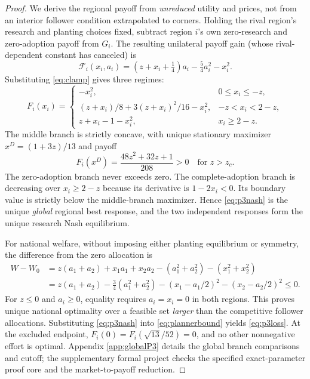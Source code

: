 \documentclass[11pt,a4paper]{article}
\begin{document}
\begin{proof}
We derive the regional payoff from \emph{unreduced} utility and prices, not from an interior follower condition extrapolated to corners. Holding the rival region's research and planting choices fixed, subtract region $i$'s own zero-research and zero-adoption payoff from $G_i$. The resulting unilateral payoff gain (whose rival-dependent constant has canceled) is
\begin{equation}
 \mathcal F_i(x_i,a_i)
 =(z+x_i+\tfrac14)a_i-\tfrac54a_i^2-x_i^2.
 \label{eq:offpathpayoff}
\end{equation}
Substituting \eqref{eq:clamp} gives three regimes:
\begin{equation}
 F_i(x_i)=
 \begin{cases}
 -x_i^2,&0\leq x_i\leq-z,\\[2pt]
 (z+x_i)/8+3(z+x_i)^2/16-x_i^2,&-z<x_i<2-z,\\[2pt]
 z+x_i-1-x_i^2,&x_i\geq2-z.
 \end{cases}
 \label{eq:threebranches}
\end{equation}
The middle branch is strictly concave, with unique stationary maximizer $x^D=(1+3z)/13$ and payoff
\[
 F_i(x^D)=\frac{48z^2+32z+1}{208}>0
 \quad\text{for }z>z_c.
\]
The zero-adoption branch never exceeds zero. The complete-adoption branch is decreasing over $x_i\geq2-z$ because its derivative is $1-2x_i<0$. Its boundary value is strictly below the middle-branch maximizer. Hence \eqref{eq:p3nash} is the unique \emph{global} regional best response, and the two independent responses form the unique research Nash equilibrium.

For national welfare, without imposing either planting equilibrium or symmetry, the difference from the zero allocation is
\begin{align}
 W-W_0
 &=z(a_1+a_2)+x_1a_1+x_2a_2
   -(a_1^2+a_2^2)-(x_1^2+x_2^2)\nonumber\\
 &=z(a_1+a_2)-\frac34(a_1^2+a_2^2)
   -(x_1-a_1/2)^2-(x_2-a_2/2)^2
 \leq0.
 \label{eq:plannerbound}
\end{align}
For $z\leq0$ and $a_i\geq0$, equality requires $a_i=x_i=0$ in both regions. This proves unique national optimality over a feasible set \emph{larger} than the competitive follower allocations. Substituting \eqref{eq:p3nash} into \eqref{eq:plannerbound} yields \eqref{eq:p3loss}. At the excluded endpoint, $F_i(0)=F_i(\sqrt{13}/52)=0$, and no other nonnegative effort is optimal. Appendix \ref{app:globalP3} details the global branch comparisons and cutoff; the supplementary formal project checks the specified exact-parameter proof core and the market-to-payoff reduction.
\end{proof}
\end{document}
